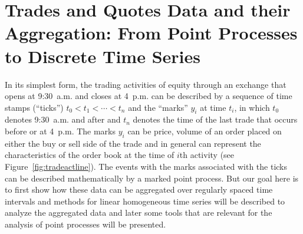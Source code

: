 \section{Trades and Quotes Data and their Aggregation: From Point Processes to Discrete Time Series \label{sec:tradesandquotes}}


In its simplest form, the trading activities of equity through an exchange that opens at 9:30~a.m. and closes at 4~p.m. can be described by a sequence of time stamps (``ticks'') $t_0 < t_1 < \cdots < t_n$ and the ``marks'' $y_i$ at time $t_i$, in which $t_0$ denotes 9:30~a.m. and after and $t_n$ denotes the time of the last trade that occurs before or at 4~p.m. The marks $y_i$ can be price, volume of an order placed on either the buy or sell side of the trade and in general can represent the characteristics of the order book at the time of $i$th activity (see Figure~\ref{fig:tradeactline}). The events with the marks associated with the ticks can be described mathematically by a marked point process. But our goal here is to first show how these data can be aggregated over regularly spaced time intervals and methods for linear homogeneous time series will be described to analyze the aggregated data and later some tools that are relevant for the analysis of point processes will be presented.



